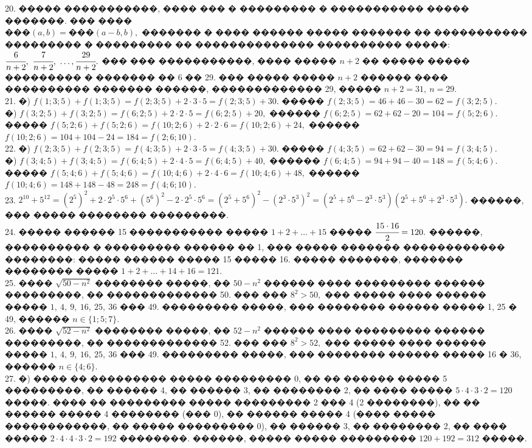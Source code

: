 \documentclass[12pt]{article}
\begin{document}
20. ����� �����������, ���� ��� � ��������� � ����������� ����� �������. ��� ����\\ ���$(a,b)=$���$(a-b,b),$ ������� � ���� ������ ����� ������� �� ����������� ��������� � ��������� �� �������������� ���������� �����: $\cfrac{6}{n+2},\ \cfrac{7}{n+2},\ \ldots, \cfrac{29}{n+2}.$ ��� ��� �����������, ���� ����� $n+2$ �� ����� ����� ��������� � ������� �� 6 �� 29. ��� ����� ����� $n+2$ ������ ���� ���������� ������� ������, ������������� 29, ����� $n+2=31,\ n=29.$\\
21. �) $f(1;3;5)+f(1;3;5)=f(2;3;5)+2\cdot3\cdot5=f(2;3;5)+30.$ ����� $f(2;3;5)=46+46-30=62=f(3;2;5).$\\
�) $f(3;2;5)+f(3;2;5)=f(6;2;5)+2\cdot2\cdot5=f(6;2;5)+20,$ ������ $f(6;2;5)=62+62-20=104=f(5;2;6).$ �����
$f(5;2;6)+f(5;2;6)=f(10;2;6)+2\cdot2\cdot6=f(10;2;6)+24,$ ������ $f(10;2;6)=104+104-24=184=f(2;6;10).$\\
22. �) $f(2;3;5)+f(2;3;5)=f(4;3;5)+2\cdot3\cdot5=f(4;3;5)+30.$ ����� $f(4;3;5)=62+62-30=94=f(3;4;5).$\\
�) $f(3;4;5)+f(3;4;5)=f(6;4;5)+2\cdot4\cdot5=f(6;4;5)+40,$ ������ $f(6;4;5)=94+94-40=148=f(5;4;6).$ �����
$f(5;4;6)+f(5;4;6)=f(10;4;6)+2\cdot4\cdot6=f(10;4;6)+48,$ ������ $f(10;4;6)=148+148-48=248=f(4;6;10).$\\
23. $2^{10}+5^{12}=(2^5)^2+2\cdot2^5\cdot5^6+(5^6)^2-2\cdot2^5\cdot5^6=(2^5+5^6)^2-(2^3\cdot5^3)^2=
(2^5+5^6-2^3\cdot5^3)(2^5+5^6+2^3\cdot5^3).$ ������, ��� ����� �������� ���������.\\
24. ����� ������ 15 ����������� ����� $1+2+\ldots+15$ ����� $\cfrac{15\cdot16}{2}=120.$ ������, ���������� � ��������� ������ �� 1, ��� ����� ������� ������������ ��������: ����� ������ ����� 15 ����� 16. ����� �������, ������� �������� ����� $1+2+\ldots+14+16=121.$\\
25. ���� $\sqrt{50-n^2}$ �������� �����, �� $50-n^2$ ������ ���� ��������� ������ ���������, �� ������������� 50. ��� ��� $8^2>50,$ ��� ����� ���� ������ ����� $1,\ 4,\ 9,\ 16,\ 25,\ 36$ ��� 49. ��������� �����, ��� �������� ������ ����� 1, 25 � 49, ������ $n\in\{1;5;7\}.$\\
26. ���� $\sqrt{52-n^2}$ �������� �����, �� $52-n^2$ ������ ���� ��������� ������ ���������, �� ������������� 52. ��� ��� $8^2>52,$ ��� ����� ���� ������ ����� $1,\ 4,\ 9,\ 16,\ 25,\ 36$ ��� 49. ��������� �����, ��� �������� ������ ����� 16 � 36, ������ $n\in\{4;6\}.$\\
27. �) ���� �� ��������� ����� ��������� 0, �� �� ������ ����� 5 ���������, �� ������ 4, �� ������ 3, �� �������� 2, �� ���� ����� $5\cdot4\cdot3\cdot2=120$ �����. ���� �� ��������� ����� ��������� 2 ��� 4 (2 ��������), �� �� ������ ����� 4 �������� (��� 0), �� ������ ����� 4 (���� ����� ������������, �� ����� ��������� 0), �� ������ 3, �� �������� 2, �� ���� ����� $2\cdot4\cdot4\cdot3\cdot2=192$ ��������. ������, ����� ����� ��������� $120+192=312$ �����.\\
\end{document}
